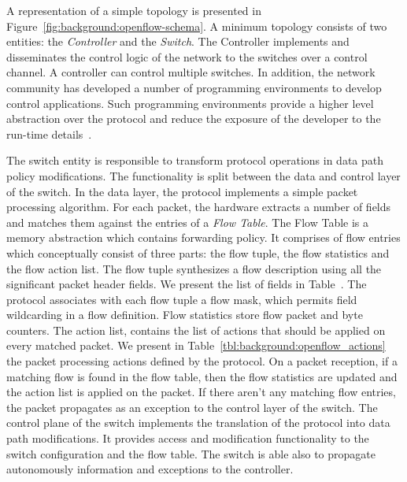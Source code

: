 A representation of a simple \of topology is presented in
Figure~\ref{fig:background:openflow-schema}. A minimum \of topology consists of
two entities: the \emph{Controller} and the \emph{Switch}. The Controller
implements and disseminates the control logic of the network to the switches
over a control channel. A controller can control multiple switches. In addition, 
the network community has developed a number of programming environments to
develop \of control applications. Such programming environments provide a 
higher level abstraction over the \of protocol and reduce the exposure of
the developer to the run-time details~\cite{nox,floodlight,nodeflow}.

The switch entity is responsible to transform \of protocol operations in data
path policy modifications. The \of functionality is split between the data and
control layer of the switch. In the data layer, the protocol implements a simple
packet processing algorithm.  For each packet, the hardware extracts a number of
fields and matches them against the entries of a \emph{Flow Table}.  The Flow
Table is a memory abstraction which contains forwarding policy. It comprises of
flow entries which conceptually consist of three parts: the flow tuple, the flow
statistics and the flow action list.  The flow tuple synthesizes a flow
description using all the significant packet header fields.  We present the list
of fields in Table~\cite{tbl:background:openflow_tupple}.  The protocol
associates with each flow tuple a flow mask, which permits field wildcarding in
a flow definition.  Flow statistics store flow packet and byte counters. The
action list, contains the list of actions that should be applied on every
matched packet.  We present in Table~\ref{tbl:background:openflow_actions} the
packet processing actions defined by the \of protocol.  On a packet reception,
if a matching flow is found in the flow table, then the flow statistics are
updated and the action list is applied on the packet. If there aren't any
matching flow entries, the packet propagates as an exception to the control
layer of the switch.  The control plane of the switch implements the translation
of the \of protocol into data path modifications.  It provides access and
modification functionality to the switch configuration and the flow table. The
switch is able also to propagate autonomously information and exceptions 
to the controller. 


